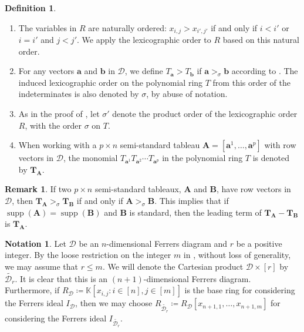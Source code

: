 \documentclass[11pt,a4paper,reqno,dvipsnames]{amsart}
\theoremstyle{plain}
\theoremstyle{definition}
\newtheorem{Assumptions and Discussion}[Theorem]{Assumptions and Discussion}
\newtheorem{Definition}[Theorem]{Definition}
\newtheorem{Remark}[Theorem]{Remark}
\newtheorem{Notation}[Theorem]{Notation}
\theoremstyle{remark}
\def\KK{{\mathbb K}}
\def\supp{\operatorname{supp}}
\newcommand\bda{{\bm a}}
\newcommand\bdb{{\bm b}}
\newcommand\bdT{{\bm T}}
\newcommand\bfA{\mathbf{A}}
\newcommand\bfB{\mathbf{B}}
\newcommand\calD{\mathcal{D}}
\begin{document}
\begin{Definition}
    \label{order}
    \begin{enumerate}[a]
        \item The variables in $R$ are naturally ordered: $x_{i,j}>x_{i',j'}$ if and only if $i<i'$ or $i=i'$ and $j<j'$. We apply the lexicographic order to $R$ based on this natural order.

        \item For any vectors $\bda$ and $\bdb$ in $\calD $, we define $T_{\bda} > T_{\bdb}$ if $\bda >_{\sigma} \bdb$ according to . 
            The induced lexicographic order on the polynomial ring $T$ from this order of the indeterminates is also denoted by ${\sigma}$, by abuse of notation.

        \item As in the proof of , let $\sigma'$ denote the product order of the lexicographic order $R$, with the order $\sigma$ on $T$.

        \item When working with a  $p\times n$  semi-standard tableau $\bfA=[\bda^1,\dots,\bda^p]$ with row vectors in $\calD$, the monomial $T_{\bda^1}T_{\bda^2}\cdots T_{\bda^p}$ in the polynomial ring $T$ is denoted by $\bdT_\bfA$. 
    \end{enumerate}
\end{Definition}

\begin{Remark}
    If two $p\times n$ semi-standard tableaux, $\bfA$ and $\bfB$, have row vectors in $\calD$, then $\bdT_{\bfA}>_{\sigma}\bdT_{\bfB}$ if and only if $\bfA>_{\sigma}\bfB$. This implies that if $\supp(\bfA)=\supp(\bfB)$ and $\bfB$ is standard, then the leading term of $\bdT_\bfA-\bdT_\bfB$ is $\bdT_\bfA$.
\end{Remark}

\begin{Notation}
    \label{tildeD}
    Let $\calD$ be an $n$-dimensional Ferrers diagram and $r$ be a positive integer. By the loose restriction on the integer $m$ in , without loss of generality, we may assume that $r\le m$. We will denote the Cartesian product $\calD\times [r]$ by $\widetilde{\calD_r}$. It is clear that this is an $(n+1)$-dimensional Ferrers diagram. Furthermore, if $R_{\calD}\coloneqq \KK[x_{i,j} : i\in [n], j\in [m]]$ is the base ring for considering the Ferrers ideal $I_{\calD}$, then we may choose $R_{\widetilde{\calD_r}}\coloneqq R_{\calD}[x_{n+1,1},\dots,x_{n+1,m}]$ for considering the Ferrers ideal $I_{\widetilde{\calD_r}}$. 
\end{Notation}
\end{document}

